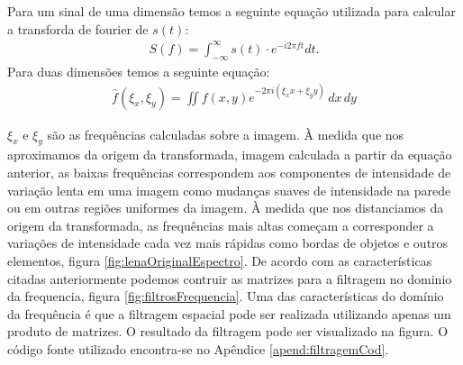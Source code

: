 \documentclass[
	article,			%
	11pt,				%
	oneside,			%
	a4paper,			%
	english,			%
	brazil,				%
	sumario=tradicional
	]{abntex2}
\begin{document}
Para um sinal de uma dimensão temos a seguinte equação utilizada para calcular a
transforda de fourier de $s(t)$:
\begin{align}
S(f) = \int_{-\infty}^{\infty} s(t) \cdot e^{-i 2\pi f t} dt.
\end{align}
Para duas dimensões temos a seguinte equação:
\begin{align}
\displaystyle \hat{f}(\xi_x, \xi_y)=
\displaystyle \iint f(x,y) e^{-2\pi i(\xi_x x+\xi_y y)}\,dx\,dy
\end{align}

$\xi_x$ e $\xi_y$ são as frequências calculadas sobre a imagem.
À medida que nos aproximamos da origem da transformada, imagem calculada a
partir da equação anterior, as baixas frequências correspondem aos componentes
de intensidade de variação lenta em uma imagem como mudanças suaves de
intensidade na parede ou em outras regiões uniformes da imagem.
À medida que nos distanciamos da origem da transformada, as frequências mais
altas começam a corresponder a variações de intensidade cada vez mais rápidas
como bordas de objetos e outros elementos, figura
\ref{fig:lenaOriginalEspectro}.
De acordo com as características citadas anteriormente podemos contruir as
matrizes para a filtragem  no dominio da frequencia, figura
\ref{fig:filtrosFrequencia}. Uma das características do domínio da frequência é
que a filtragem espacial pode ser realizada utilizando apenas um produto de
matrizes. O resultado da filtragem pode ser visualizado na figura. O código
fonte utilizado encontra-se no Apêndice \ref{apend:filtragemCod}.
\end{document}
